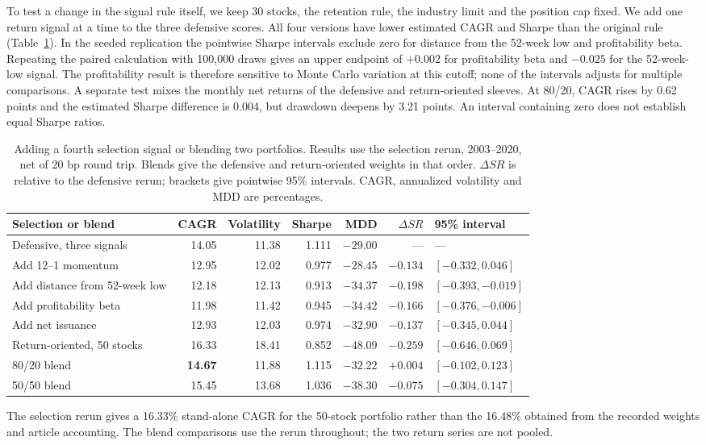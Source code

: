 \documentclass[letterpaper,journal]{IEEEtran}
\begin{document}
To test a change in the signal rule itself, we keep 30 stocks, the retention rule, the industry limit and the position cap fixed. We add one return signal at a time to the three defensive scores. All four versions have lower estimated CAGR and Sharpe than the original rule (Table~\ref{tab:selectionrisk}). In the seeded replication the pointwise Sharpe intervals exclude zero for distance from the 52-week low and profitability beta. Repeating the paired calculation with 100,000 draws gives an upper endpoint of $+0.002$ for profitability beta and $-0.025$ for the 52-week-low signal. The profitability result is therefore sensitive to Monte Carlo variation at this cutoff; none of the intervals adjusts for multiple comparisons. A separate test mixes the monthly net returns of the defensive and return-oriented sleeves. At 80/20, CAGR rises by 0.62 points and the estimated Sharpe difference is 0.004, but drawdown deepens by 3.21 points. An interval containing zero does not establish equal Sharpe ratios.

\begin{table}[!tp]\centering
\caption{Adding a fourth selection signal or blending two portfolios. Results use the selection rerun, 2003--2020, net of 20 bp round trip. Blends give the defensive and return-oriented weights in that order. $\Delta SR$ is relative to the defensive rerun; brackets give pointwise 95\% intervals. CAGR, annualized volatility and MDD are percentages.}\label{tab:selectionrisk}
\small\begin{tabular}{lrrrrrl}\toprule
Selection or blend & CAGR & Volatility & Sharpe & MDD & $\Delta SR$ & 95\% interval\\\midrule
Defensive, three signals & 14.05 & 11.38 & 1.111 & $-29.00$ & --- & ---\\
Add 12--1 momentum & 12.95 & 12.02 & 0.977 & $-28.45$ & $-0.134$ & $[-0.332,0.046]$\\
Add distance from 52-week low & 12.18 & 12.13 & 0.913 & $-34.37$ & $-0.198$ & $[-0.393,-0.019]$\\
Add profitability beta & 11.98 & 11.42 & 0.945 & $-34.42$ & $-0.166$ & $[-0.376,-0.006]$\\
Add net issuance & 12.93 & 12.03 & 0.974 & $-32.90$ & $-0.137$ & $[-0.345,0.044]$\\\midrule
Return-oriented, 50 stocks & 16.33 & 18.41 & 0.852 & $-48.09$ & $-0.259$ & $[-0.646,0.069]$\\
80/20 blend & \textbf{14.67} & 11.88 & 1.115 & \underline{$-32.22$} & $+0.004$ & $[-0.102,0.123]$\\
50/50 blend & 15.45 & 13.68 & 1.036 & $-38.30$ & $-0.075$ & $[-0.304,0.147]$\\
\bottomrule
\end{tabular}\end{table}
The selection rerun gives a 16.33\% stand-alone CAGR for the 50-stock portfolio rather than the 16.48\% obtained from the recorded weights and article accounting. The blend comparisons use the rerun throughout; the two return series are not pooled.
\end{document}
